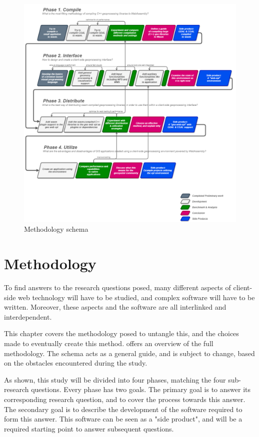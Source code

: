 
\begin{figure}
    \centering
    \graphicspath{ {../schemas/methodology/} }
    \includegraphics[width=14cm]{method.png}
    \caption{Methodology schema}
    \label{fig:method}
\end{figure}

\section{Methodology}

To find answers to the research questions posed, many different aspects of client-side web technology will have to be studied, and complex software will have to be written. Moreover, these aspects and the software are all interlinked and interdependent.

This chapter covers the methodology posed to untangle this, and the choices made to eventually create this method.  offers an overview of the full methodology. The schema acts as a general guide, and is subject to change, based on the obstacles encountered during the study. 

As shown, this study will be divided into four phases, matching the four sub-research questions. Every phase has two goals. The primary goal is to answer its corresponding research question, and to cover the process towards this answer. The secondary goal is to describe the development of the software required to form this answer. This software can be seen as a "side product", and will be a required starting point to answer subsequent questions. 


